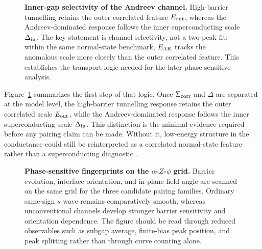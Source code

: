 \documentclass[aps,prl,twocolumn,superscriptaddress,longbibliography]{revtex4-2}
\begin{document}
\begin{figure}[t]
  \centering
  \caption{\textbf{Inner-gap selectivity of the Andreev channel.}
  High-barrier tunnelling retains the outer correlated feature $E_{\rm out}$,
  whereas the Andreev-dominated response follows the inner superconducting scale
  $\Delta_{\rm in}$. The key statement is channel selectivity, not a two-peak
  fit: within the same normal-state benchmark, $E_{\rm AR}$ tracks the anomalous
  scale more closely than the outer correlated feature. This establishes the
  transport logic needed for the later phase-sensitive analysis.}
  \label{fig:selectivity}
\end{figure}

Figure~\ref{fig:selectivity} summarizes the first step of that logic. Once
$\Sigma_{\rm corr}$ and $\Delta$ are separated at the model level, the
high-barrier tunnelling response retains the outer correlated scale
$E_{\rm out}$, while the Andreev-dominated response follows the inner
superconducting scale $\Delta_{\rm in}$. This distinction is the minimal
evidence required before any pairing claim can be made. Without it, low-energy
structure in the conductance could still be reinterpreted as a correlated
normal-state feature rather than a superconducting diagnostic~\cite{Kim2026Intervalley}.

\begin{figure}[t]
  \centering
  \caption{\textbf{Phase-sensitive fingerprints on the $\alpha$-$Z$-$\phi$
  grid.} Barrier evolution, interface orientation, and in-plane field angle are
  scanned on the same grid for the three candidate pairing families. Ordinary
  same-sign $s$ wave remains comparatively smooth, whereas unconventional
  channels develop stronger barrier sensitivity and orientation dependence. The
  figure should be read through reduced observables such as subgap average,
  finite-bias peak position, and peak splitting rather than through curve
  counting alone.}
  \label{fig:fingerprints}
\end{figure}
\end{document}
